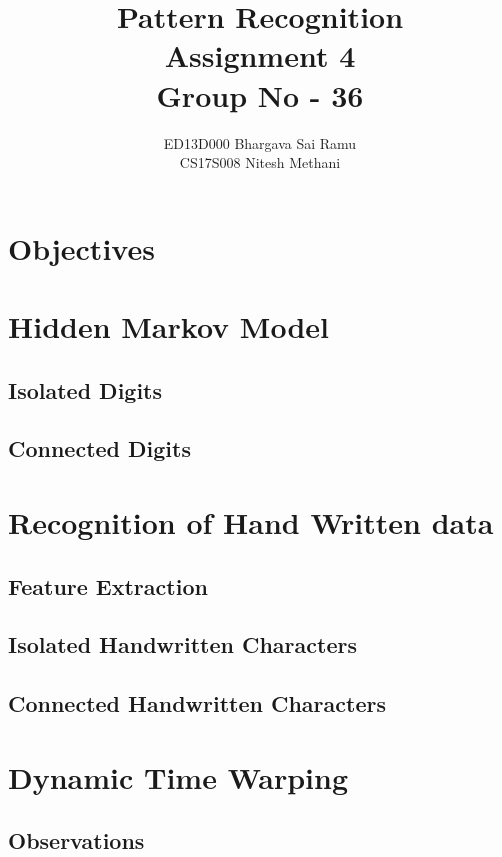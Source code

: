 \documentclass[a4paper]{article}
\title{Pattern Recognition\\
	Assignment 4\\
	Group No - 36 }
\author{ED13D000 Bhargava Sai Ramu\\
	CS17S008 Nitesh Methani}
\begin{document}
\maketitle
\hypersetup{linkcolor=black}
\tableofcontents

\section{Objectives}


\section{Hidden Markov Model}
\subsection{Isolated Digits}



\newpage
\subsection{Connected Digits}


\section{Recognition of Hand Written data}
\subsection{Feature Extraction}


\subsection{Isolated Handwritten Characters}



\subsection{Connected Handwritten Characters}


\newpage
\section{Dynamic Time Warping}
\subsection{Observations}

\end{document}
